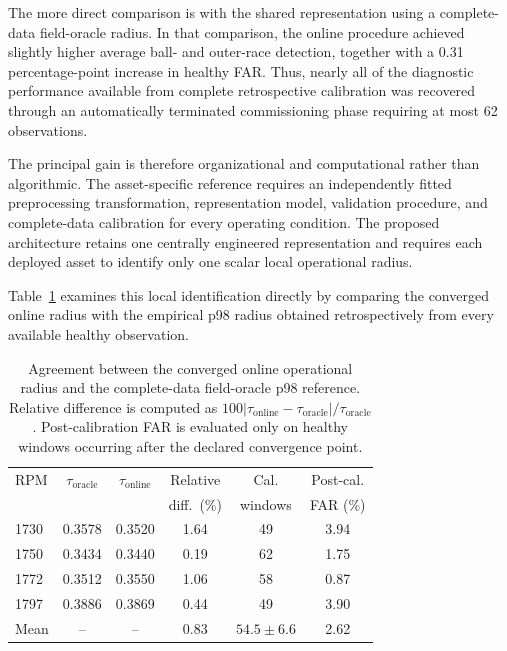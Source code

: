 \documentclass[numbered]{trbunofficial}
\begin{document}
The more direct comparison is with the shared representation using a
complete-data field-oracle radius. In that comparison, the online procedure
achieved slightly higher average ball- and outer-race detection, together
with a 0.31 percentage-point increase in healthy FAR. Thus, nearly all of
the diagnostic performance available from complete retrospective
calibration was recovered through an automatically terminated commissioning
phase requiring at most 62 observations.

The principal gain is therefore organizational and computational rather
than algorithmic. The asset-specific reference requires an independently
fitted preprocessing transformation, representation model, validation
procedure, and complete-data calibration for every operating condition.
The proposed architecture retains one centrally engineered representation
and requires each deployed asset to identify only one scalar local
operational radius.

Table~\ref{tab:online-oracle-agreement} examines this local identification
directly by comparing the converged online radius with the empirical p98
radius obtained retrospectively from every available healthy observation.

\begin{table}[!ht]
\centering
\caption{Agreement between the converged online operational radius and the
complete-data field-oracle p98 reference. Relative difference is computed as
$100|\tau_{\mathrm{online}}-\tau_{\mathrm{oracle}}|/
\tau_{\mathrm{oracle}}$. Post-calibration FAR is evaluated only on healthy
windows occurring after the declared convergence point.}
\label{tab:online-oracle-agreement}
\begin{tabular}{@{}lccccc@{}}
\toprule
RPM & $\tau_{\mathrm{oracle}}$ & $\tau_{\mathrm{online}}$ & Relative & Cal.    & Post-cal. \\
    &                          &                          & diff.\ (\%) & windows & FAR (\%)  \\
\midrule
1730 & 0.3578 & 0.3520 & 1.64 & 49 & 3.94 \\
1750 & 0.3434 & 0.3440 & 0.19 & 62 & 1.75 \\
1772 & 0.3512 & 0.3550 & 1.06 & 58 & 0.87 \\
1797 & 0.3886 & 0.3869 & 0.44 & 49 & 3.90 \\
\midrule
Mean & --     & --     & 0.83 & $54.5 \pm 6.6$ & 2.62 \\
\bottomrule
\end{tabular}
\end{table}
\end{document}
